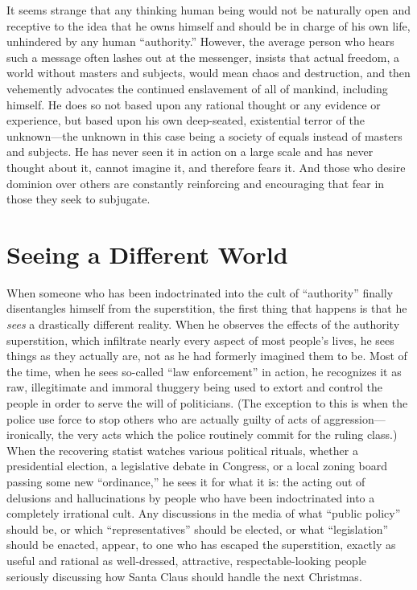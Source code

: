 \documentclass{book}
\begin{document}
It seems strange that any thinking human being would not be naturally open and receptive to the idea that he owns himself and should be in charge of his own life, unhindered by any human \enquote{authority.} However, the average person who hears such a message often lashes out at the messenger, insists that actual freedom, a world without masters and subjects, would mean chaos and destruction, and then vehemently advocates the continued enslavement of all of mankind, including himself. He does so not based upon any rational thought or any evidence or experience, but based upon his own deep-seated, existential terror of the unknown---the unknown in this case being a society of equals instead of masters and subjects. He has never seen it in action on a large scale and has never thought about it, cannot imagine it, and therefore fears it. And those who desire dominion over others are constantly reinforcing and encouraging that fear in those they seek to subjugate.

\section{Seeing a Different World}

When someone who has been indoctrinated into the cult of \enquote{authority} finally disentangles himself from the superstition, the first thing that happens is that he \emph{sees} a drastically different reality. When he observes the effects of the authority superstition, which infiltrate nearly every aspect of most people's lives, he sees things as they actually are, not as he had formerly imagined them to be. Most of the time, when he sees so-called \enquote{law enforcement} in action, he recognizes it as raw, illegitimate and immoral thuggery being used to extort and control the people in order to serve the will of politicians. (The exception to this is when the police use force to stop others who are actually guilty of acts of aggression---ironically, the very acts which the police routinely commit for the ruling class.) When the recovering statist watches various political rituals, whether a presidential election, a legislative debate in Congress, or a local zoning board passing some new \enquote{ordinance,} he sees it for what it is: the acting out of delusions and hallucinations by people who have been indoctrinated into a completely irrational cult. Any discussions in the media of what \enquote{public policy} should be, or which \enquote{representatives} should be elected, or what \enquote{legislation} should be enacted, appear, to one who has escaped the superstition, exactly as useful and rational as well-dressed, attractive, respectable-looking people seriously discussing how Santa Claus should handle the next Christmas.
\end{document}
